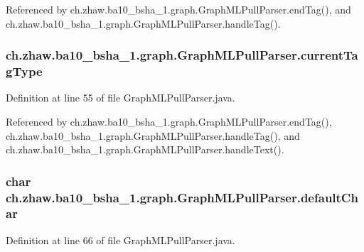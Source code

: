 Referenced by ch.zhaw.ba10\_\-bsha\_\-1.graph.GraphMLPullParser.endTag(), and ch.zhaw.ba10\_\-bsha\_\-1.graph.GraphMLPullParser.handleTag().\hypertarget{classch_1_1zhaw_1_1ba10__bsha__1_1_1graph_1_1GraphMLPullParser_ac17f293b08f00b7bca26c3937d3beae4}{
\subsubsection[{currentTagType}]{ {\bf ch.zhaw.ba10\_\-bsha\_\-1.graph.GraphMLPullParser.currentTagType}}}
\label{classch_1_1zhaw_1_1ba10__bsha__1_1_1graph_1_1GraphMLPullParser_ac17f293b08f00b7bca26c3937d3beae4}


Definition at line 55 of file GraphMLPullParser.java.

Referenced by ch.zhaw.ba10\_\-bsha\_\-1.graph.GraphMLPullParser.endTag(), ch.zhaw.ba10\_\-bsha\_\-1.graph.GraphMLPullParser.handleTag(), and ch.zhaw.ba10\_\-bsha\_\-1.graph.GraphMLPullParser.handleText().\hypertarget{classch_1_1zhaw_1_1ba10__bsha__1_1_1graph_1_1GraphMLPullParser_a0ef51caacb5fe8a0a38fe0bfdae500ff}{
\subsubsection[{defaultChar}]{\setlength{\rightskip}{0pt plus 5cm}char {\bf ch.zhaw.ba10\_\-bsha\_\-1.graph.GraphMLPullParser.defaultChar}}}
\label{classch_1_1zhaw_1_1ba10__bsha__1_1_1graph_1_1GraphMLPullParser_a0ef51caacb5fe8a0a38fe0bfdae500ff}


Definition at line 66 of file GraphMLPullParser.java.

